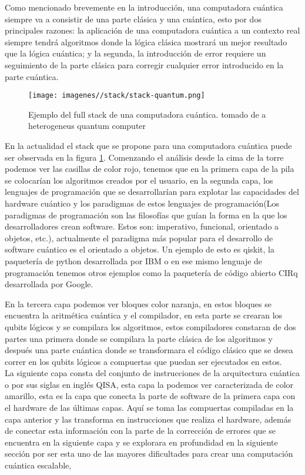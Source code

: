 Como mencionado brevemente en la introducción, una computadora cuántica siempre va a consistir de una parte clásica y una cuántica, esto por dos principales razones: la aplicación de una computadora cuántica a un contexto real siempre tendrá algoritmos donde la lógica clásica mostrará un mejor resultado que la lógica cuántica; y la segunda, la introducción de error requiere un seguimiento de la parte clásica para corregir cualquier error introducido en la parte cuántica.\\

\begin{figure}[hbtp]
    \centering
    \texttt{[image: imagenes//stack/stack-quantum.png]}
    \caption{Ejemplo del full stack de una computadora cuántica. tomado de a heterogeneus quantum computer}
    \label{fig:stack-qc}
\end{figure}

En la actualidad el stack que se propone para una computadora cuántica  puede ser observada en la figura \ref{fig:stack-qc}. Comenzando el análisis desde la cima de la torre podemos ver las casillas de color rojo, tenemos que en la primera capa de la pila se colocarían los algoritmos creados por el usuario, en la segunda capa, los lenguajes de programación que se desarrollarían para explotar las capacidades del hardware cuántico y los paradigmas de estos lenguajes de programación(Los paradigmas de programación son las filosofías que guían la forma en la que los desarrolladores crean software. Estos son:  imperativo, funcional, orientado a objetos, etc.), actualmente el paradigma más popular para el desarrollo de software cuántico es el orientado a objetos. Un ejemplo de esto es qiskit, la paquetería de python desarrollada por IBM o en ese mismo lenguaje de programación tenemos otros ejemplos como la paquetería de código abierto CIRq desarrollada por Google.

En la tercera capa podemos ver bloques color naranja, en estos bloques se encuentra la aritmética cuántica y el compilador, en esta parte se crearan los qubits lógicos y se compilara los algoritmos, estos compiladores constaran de dos partes una primera donde se compilara la parte clásica de los algoritmos y después una parte cuántica donde se transformara el código clásico que se desea correr en los qubits lógicos a compuertas que puedan ser ejecutados en estos.\\

La siguiente capa consta del conjunto de instrucciones de la arquitectura cuántica o por sus siglas en inglés QISA, esta capa la podemos ver caracterizada de color amarillo, esta es la capa que conecta la parte de software de la primera capa con el hardware de las últimas capas. Aquí se toma las compuertas compiladas en la capa anterior y las transforma en instrucciones que realiza el hardware, además de conectar esta información con la parte de la corrección de errores que se encuentra en la siguiente capa y se explorara en profundidad en la siguiente sección por ser esta uno de las mayores dificultades para crear una computación cuántica escalable, 


